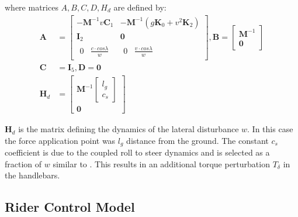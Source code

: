 where matrices \ensuremath{A,B,C,D,H_d} are defined by:
\begin{align}
    \mathbf{A} &=\begin{bmatrix}
        -\mathbf{M}^{-1}v\mathbf{C}_{1} & -\mathbf{M}^{-1}(g \mathbf{K}_{0}+v^{2}\mathbf{K}_{2}) \\
        {\mathbf{I}_2}                    & {\mathbf{0}} \\  {\begin{matrix} {0} & { \frac{c\cdot cos\lambda}{w}}\end{matrix}} &  {\begin{matrix} 0 & { \frac{v \cdot cos\lambda}{w}}\end{matrix} } 
    \end{bmatrix} , \mathbf{B}=\left[ \begin{array}{c}{\mathbf{M}^{-1}} \\ {\mathbf{0}}\end{array}\right] \\
    \mathbf{C} &= {\mathbf{I}_5} , \mathbf{D}=\mathbf{0} \\
    \mathbf{H}_d &= \left[ \begin{array}{c}{\mathbf{M}^{-1}}{\begin{bmatrix} l_g \\ c_s\end{bmatrix} }  \\ {\mathbf{0}}\end{array}\right] 
\end{align}

\ensuremath{\mathbf{H}_d} is the matrix defining the dynamics of the lateral disturbance \ensuremath{w}. In this case the force application point was \ensuremath{l_g} distance from the ground. The constant \ensuremath{c_s} coefficient is due to the coupled roll to steer dynamics and is selected as a fraction of \ensuremath{w} similar to \citet{schwab2013}. This results in an additional  torque perturbation \ensuremath{T_\delta } in the handlebars.

\subsection{Rider Control Model}\label{subsec:rider_model}

